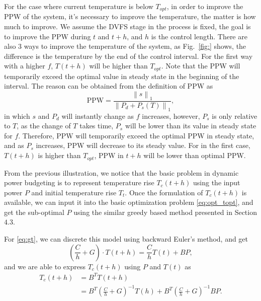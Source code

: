 For the case where current temperature is below $T_{opt}$, in order to improve the PPW of the system, it's necessary to improve the temperature, the matter is how much to improve. We assume the DVFS stage in the process is fixed, the goal is to improve the PPW during $t$ and $t+h$, and $h$ is the control length. There are also $3$ ways to improve the temperature of the system, as Fig.~\ref{fig:} shows, the difference is the temperature by the end of the control interval. For the first way with a higher $f$, $T(t+h)$ will be higher than $T_{opt}$. Note that the PPW will temporarily exceed the optimal value in steady state in the beginning of the interval. The reason can be obtained from the definition of PPW as
\begin{equation}\label{eq:ppw_detail}
\text{PPW} = \frac{\left \| s \right \|_{1}}{\left \| P_{d}+P_{s}(T) \right \|_{1}},
\end{equation}
in which $s$ and $P_{d}$ will instantly change as $f$ increases, however, $P_{s}$ is only relative to $T$, as the change of $T$ takes time, $P_{s}$ will be lower than its value in steady state for $f$. Therefore, PPW will temporarily exceed the optimal PPW in steady state, and as $P_{s}$ increases, PPW will decrease to its steady value. For in the first case, $T(t+h)$ is higher than $T_{opt}$, PPW in $t+h$ will be lower than optimal PPW. 



From the previous illustration, we notice that the basic problem in dynamic power budgeting is to represent temperature rise $T_{c}(t+h)$ using the input power $P$ and initial temperature rise $T_{t}$. Once the formulation of $T_{c}(t+h)$ is available, we can input it into the basic optimization problem \eqref{eq:opt_topt}, and get the sub-optimal $P$ using the similar greedy based method presented in Section $4.3$.




For \eqref{eq:gt}, we can discrete this model using backward Euler's method, and get
\begin{equation}\label{eq:discrete_gt}
(\frac{C}{h}+G)\cdot T(t+h)=\frac{C}{h}T(t)+BP,
\end{equation}
and we are able to express $T_{c}(t+h)$ using $P$ and $T(t)$ as
\begin{equation}\label{eq:discrete_gt}
  \begin{split}
T_{c}(t+h)&=B^{T}T(t+h)\\
&=B^{T}(\frac{C}{h}+G)^{-1}T(h)+B^{T}(\frac{C}{h}+G)^{-1}BP.
  \end{split}
\end{equation}

